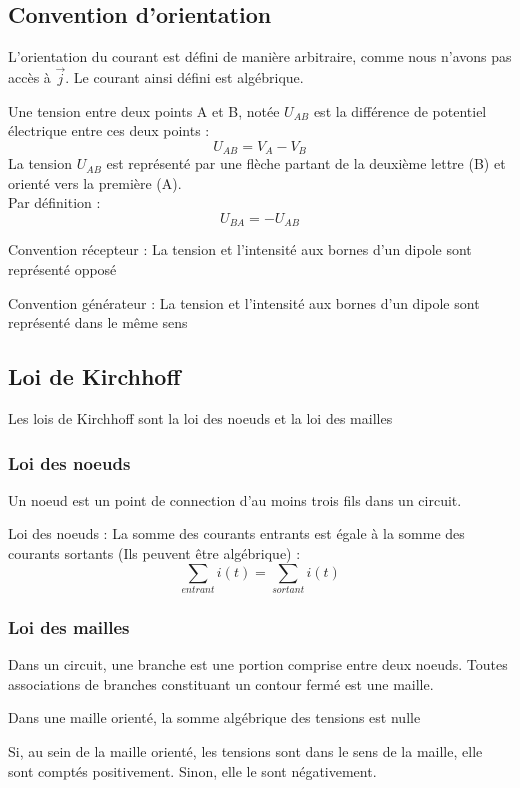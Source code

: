 \subsection{Convention d'orientation}
\begin{conv}
L'orientation du courant est défini de manière arbitraire, comme nous n'avons pas accès à $\overrightarrow{j}$. Le courant ainsi défini est algébrique.
\end{conv}
\begin{conv}
Une tension entre deux points A et B, notée $U_{AB}$ est la différence de potentiel électrique entre ces deux points :
$$U_{AB} = V_A-V_B$$
La tension $U_{AB}$ est représenté par une flèche partant de la deuxième lettre (B) et orienté vers la première (A).\\
Par définition :
$$U_{BA} = - U_{AB}$$
\end{conv}
\begin{conv}
Convention récepteur : La tension et l'intensité aux bornes d'un dipole sont représenté opposé
\end{conv}
\begin{conv}
Convention générateur : La tension et l'intensité aux bornes d'un dipole sont représenté dans le même sens
\end{conv}
\subsection{Loi de Kirchhoff}
Les lois de Kirchhoff sont la loi des noeuds et la loi des mailles
\subsubsection{Loi des noeuds}
Un noeud est un point de connection d'au moins trois fils dans un circuit.
\begin{loi}
Loi des noeuds : La somme des courants entrants est égale à la somme des courants sortants (Ils peuvent être algébrique) :
$$\sum_{entrant}i(t) = \sum_{sortant}i(t)$$
\end{loi}
\subsubsection{Loi des mailles}
Dans un circuit, une branche est une portion comprise entre deux noeuds. Toutes associations de branches constituant un contour fermé est une maille.
\begin{loi}
Dans une maille orienté, la somme algébrique des tensions est nulle
\end{loi}
Si, au sein de la maille orienté, les tensions sont dans le sens de la maille, elle sont comptés positivement. Sinon, elle le sont négativement.
